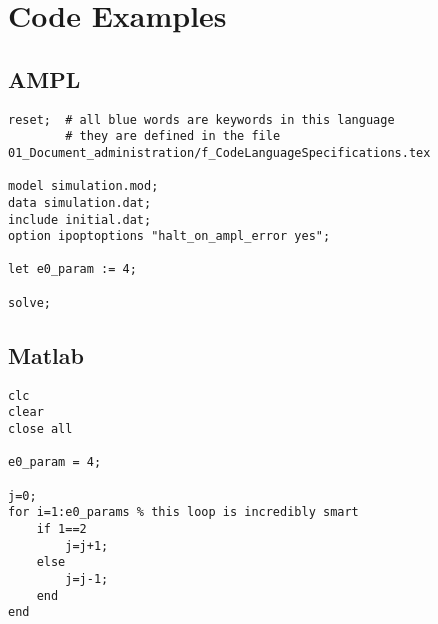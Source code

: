 \chapter{Code Examples}\label{ch:code_examples}
\section{AMPL}
\lstset{language=ampl}
\begin{lstlisting}[caption={Code example for AMPL}]
reset;	# all blue words are keywords in this language
		# they are defined in the file 01_Document_administration/f_CodeLanguageSpecifications.tex

model simulation.mod;
data simulation.dat;
include initial.dat;
option ipoptoptions "halt_on_ampl_error yes";

let e0_param := 4;

solve;

\end{lstlisting}
\section{Matlab}
\lstset{language=matlab}
\begin{lstlisting}[caption={Code example for Matlab}]
clc
clear
close all

e0_param = 4;

j=0;
for i=1:e0_params % this loop is incredibly smart
	if 1==2
		j=j+1;
	else
		j=j-1;
	end
end

\end{lstlisting}